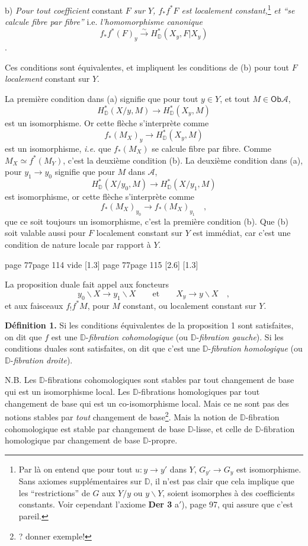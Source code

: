 \documentclass[11pt,leqno]{article}
\newcommand{\printedpage}[1]{\marginnote{\scriptsize\sffamily ed.\ #1}}
\newcommand{\msp}[1]{%
  \begingroup\def\thismsp{#1}\def\blankmsp{page 114 vide}%
  \ifx\thismsp\blankmsp
    \marginnote{\scriptsize\sffamily [114: vide]}[1.3\baselineskip]%
  \else\def\followingmsp{page 115}%
    \ifx\thismsp\followingmsp
      \marginnote{\scriptsize\sffamily [page 115]}[2.6\baselineskip]%
    \else\marginnote{\scriptsize\sffamily [#1]}[1.3\baselineskip]\fi
  \fi\endgroup}
\newcommand{\Ob}{\ensuremath{\mathsf{Ob}}}
\newcommand{\D}{\ensuremath{\mathbb{D}}}
\newcommand{\bs}{\backslash}
\begin{document}
\hspace*{\parindent}b) \textit{Pour tout coefficient} constant \textit{$F$ sur $Y$, $f_*f^*F$ est localement constant,}\footnote[33]{Par là on entend que pour tout $u : y \to y'$ dans $Y$, $G_{y'} \to G_y$ est isomorphisme. Sans axiomes supplémentaires sur $\D$, il n'est pas clair que cela implique que les ``restrictions'' de $G$ aux $Y/y$ ou $y\bs Y$, soient isomorphes à des coefficients constants. Voir cependant l'axiome \textbf{Der 3} a$'$), page 97, qui assure que c'est pareil.} \textit{et ``se calcule fibre par fibre''} i.e. \textit{l'homomorphisme canonique}
\[
f_*f^*(F)_y \overset{\sim}{\longrightarrow} H^*_{\D}(X_y, F|X_y)
\]
.

Ces conditions sont équivalentes, et impliquent les conditions de (b) pour tout $F$ \textit{localement} constant sur $Y$.

La première condition dans (a) signifie que pour tout $y \in Y$, et tout $M \in \Ob \mathcal{A}$,
\[
H^*_{\D}(X/y, M) \longrightarrow H^*_{\D}(X_y, M)
\]
est un isomorphisme. Or cette flèche s'interprète comme
\[
f_*(M_X)_y \longrightarrow H^*_{\D}(X_y, M)
\]
est un isomorphisme, \textit{i.e.} que $f_*(M_X)$ se calcule fibre par fibre. Comme $M_X \simeq f^*(M_Y)$, c'est la deuxième condition (b). La deuxième condition dans (a), pour $y_1 \to y_0$ signifie que pour $M$ dans $\mathcal{A}$,
\[
H^*_{\D}(X/y_0, M) \longrightarrow H^*_{\D}(X/y_1, M)
\]
est isomorphisme, or cette flèche s'interprète comme
\[
f_*(M_X)_{y_0} \longrightarrow f_*(M_X)_{y_1} \quad ,
\]
que ce soit toujours un isomorphisme, c'est la première condition (b). Que (b) soit valable aussi pour $F$ localement constant sur $Y$ est immédiat, car c'est une condition de nature locale par rapport à $Y$.

\msp{page 77}

La proposition duale fait appel aux foncteurs
\[
y_0\bs X \longrightarrow y_1\bs X \qquad \text{et} \qquad X_y \longrightarrow y\bs X \quad ,
\]
et aux faisceaux $f_!f^*M$, pour $M$ constant, ou localement constant sur $Y$.

\printedpage{47}
\textbf{Définition 1.} Si les conditions équivalentes de la proposition 1 sont satisfaites, on dit que $f$ est une $\D$-\textit{fibration cohomologique} (ou $\D$-\textit{fibration gauche}). Si les conditions duales sont satisfaites, on dit que c'est une $\D$-\textit{fibration homologique} (ou $\D$-\textit{fibration droite}).

N.B. Les $\D$-fibrations cohomologiques sont stables par tout changement de base qui est un isomorphisme local. Les $\D$-fibrations homologiques par tout changement de base qui est un co-isomorphisme local. Mais ce ne sont pas des notions stables par \textit{tout} changement de base\footnote[34]{? donner exemple!}. Mais la notion de $\D$-fibration cohomologique est stable par changement de base $\D$-lisse, et celle de $\D$-fibration homologique par changement de base $\D$-propre.
\end{document}
